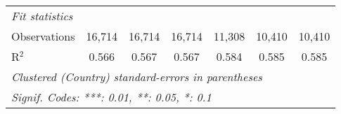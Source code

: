 \begin{tabular}{lcccccc}
   \midrule \emph{Fit statistics}\\
   Observations                                                                                       & 16,714  & 16,714         & 16,714         & 11,308         & 10,410         & 10,410\\  
   R$^2$                                                                                              & 0.566   & 0.567          & 0.567          & 0.584          & 0.585          & 0.585\\  
   \midrule
   \multicolumn{7}{l}{\emph{Clustered (Country) standard-errors in parentheses}}\\
   \multicolumn{7}{l}{\emph{Signif. Codes: ***: 0.01, **: 0.05, *: 0.1}}\\
\end{tabular}
\par\endgroup


